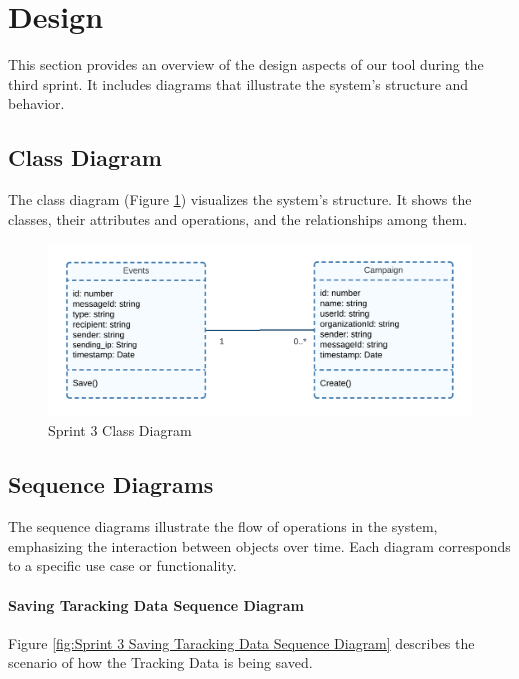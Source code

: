 \section{Design}

This section provides an overview of the design aspects of our tool during the third sprint. It includes diagrams that illustrate the system's structure and behavior.

\subsection{Class Diagram}

The class diagram (Figure \ref{fig:Sprint 3 Class Diagram}) visualizes the system's structure. It shows the classes, their attributes and operations, and the relationships among them.

\begin{figure}[ht]
	\centering
	\includegraphics[width=\linewidth]{Images/Sprint3/class diag.png}
	\caption{Sprint 3 Class Diagram}
	\label{fig:Sprint 3 Class Diagram}
\end{figure}

\subsection{Sequence Diagrams}

The sequence diagrams illustrate the flow of operations in the system, emphasizing the interaction between objects over time. Each diagram corresponds to a specific use case or functionality.

\paragraph{Saving Taracking Data Sequence Diagram}

Figure \ref{fig:Sprint 3 Saving Taracking Data Sequence Diagram} describes the scenario of how the Tracking Data is being saved.

